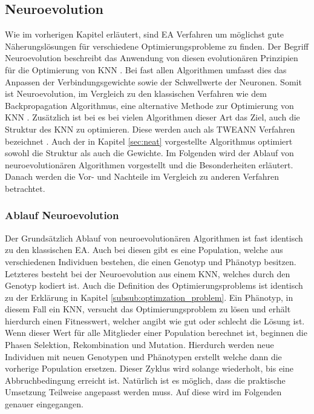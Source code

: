 \subsection{Neuroevolution}
Wie im vorherigen Kapitel erläutert, sind \ac{EA} Verfahren um möglichst gute Näherungslösungen für verschiedene Optimierungsprobleme zu finden. Der Begriff Neuroevolution beschreibt das Anwendung von diesen evolutionären Prinzipien für die Optimierung von \ac{KNN} \cite{meisner2009neurostrategies}. Bei fast allen Algorithmen umfasst dies das Anpassen der Verbindungsgewichte sowie der Schwellwerte der Neuronen. Somit ist Neuroevolution, im Vergleich zu den klassischen Verfahren wie dem Backpropagation Algorithmus, eine alternative Methode zur Optimierung von \ac{KNN} \cite{whitley1993genetic}. Zusätzlich ist bei es bei vielen Algorithmen dieser Art das Ziel, auch die Struktur des \ac{KNN} zu optimieren. Diese werden auch als \ac{TWEANN} Verfahren bezeichnet \cite{stanley2002evolving}. Auch der in Kapitel \ref{sec:neat} vorgestellte Algorithmus optimiert sowohl die Struktur als auch die Gewichte. Im Folgenden wird der Ablauf von neuroevolutionären Algorithmen vorgestellt und die Besonderheiten erläutert. Danach werden die Vor- und Nachteile im Vergleich zu anderen Verfahren betrachtet.

\subsubsection{Ablauf Neuroevolution}
Der Grundsätzlich Ablauf von neuroevolutionären Algorithmen ist fast identisch zu den klassischen \ac{EA}. Auch bei diesen gibt es eine Population, welche aus verschiedenen Individuen bestehen, die einen Genotyp und Phänotyp besitzen. Letzteres besteht bei der Neuroevolution aus einem \ac{KNN}, welches durch den Genotyp kodiert ist. Auch die Definition des Optimierungsproblems ist identisch zu der Erklärung in Kapitel \ref{subsub:optimzation_problem}. Ein Phänotyp, in diesem Fall ein \ac{KNN}, versucht das Optimierungsproblem zu lösen und erhält hierdurch einen Fitnesswert, welcher angibt wie gut oder schlecht die Lösung ist. Wenn dieser Wert für alle Mitglieder einer Population berechnet ist, beginnen die Phasen Selektion, Rekombination und Mutation. Hierdurch werden neue Individuen mit neuen Genotypen und Phänotypen erstellt welche dann die vorherige Population ersetzen. Dieser Zyklus wird solange wiederholt, bis eine Abbruchbedingung erreicht ist. Natürlich ist es möglich, dass die praktische Umsetzung Teilweise angepasst werden muss. Auf diese wird im Folgenden genauer eingegangen.


